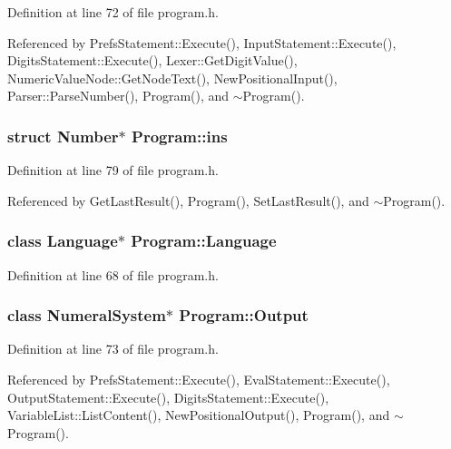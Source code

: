 Definition at line 72 of file program.\+h.



Referenced by Prefs\+Statement\+::\+Execute(), Input\+Statement\+::\+Execute(), Digits\+Statement\+::\+Execute(), Lexer\+::\+Get\+Digit\+Value(), Numeric\+Value\+Node\+::\+Get\+Node\+Text(), New\+Positional\+Input(), Parser\+::\+Parse\+Number(), Program(), and $\sim$\+Program().

\subsubsection[{\texorpdfstring{ins}{ins}}]{\setlength{\rightskip}{0pt plus 5cm}struct {\bf Number}$\ast$ Program\+::ins\hspace{0.3cm}{\ttfamily [private]}}\hypertarget{classProgram_a2e25341cb34cfdd6446deeadd0629528}{}\label{classProgram_a2e25341cb34cfdd6446deeadd0629528}


Definition at line 79 of file program.\+h.



Referenced by Get\+Last\+Result(), Program(), Set\+Last\+Result(), and $\sim$\+Program().

\subsubsection[{\texorpdfstring{Language}{Language}}]{\setlength{\rightskip}{0pt plus 5cm}class {\bf Language}$\ast$ Program\+::\+Language}\hypertarget{classProgram_a7c82b4c429bbee984b8bb287b9e137f7}{}\label{classProgram_a7c82b4c429bbee984b8bb287b9e137f7}


Definition at line 68 of file program.\+h.

\subsubsection[{\texorpdfstring{Output}{Output}}]{\setlength{\rightskip}{0pt plus 5cm}class {\bf Numeral\+System}$\ast$ Program\+::\+Output}\hypertarget{classProgram_ac6e84e81a8bbdf99de5beea93713d8ee}{}\label{classProgram_ac6e84e81a8bbdf99de5beea93713d8ee}


Definition at line 73 of file program.\+h.



Referenced by Prefs\+Statement\+::\+Execute(), Eval\+Statement\+::\+Execute(), Output\+Statement\+::\+Execute(), Digits\+Statement\+::\+Execute(), Variable\+List\+::\+List\+Content(), New\+Positional\+Output(), Program(), and $\sim$\+Program().

